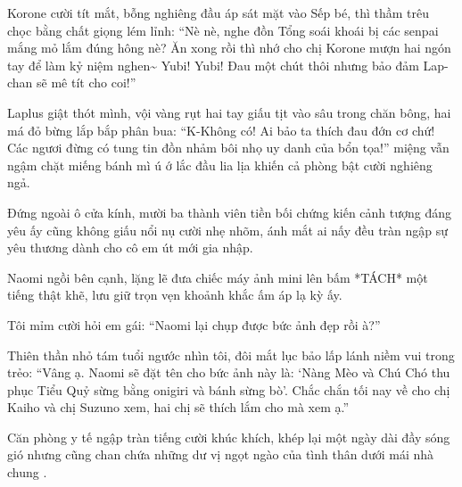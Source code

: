 \documentclass[../main.tex]{subfiles}
\begin{document}
Korone cười tít mắt, bỗng nghiêng đầu áp sát mặt vào Sếp bé, thì thầm trêu chọc bằng chất giọng lém lỉnh: ``Nè nè, nghe đồn Tổng soái khoái bị các senpai mắng mỏ lắm đúng hông nè? Ăn xong rồi thì nhớ cho chị Korone mượn hai ngón tay để làm kỷ niệm nghen\~{} Yubi! Yubi! Đau một chút thôi nhưng bảo đảm Lap-chan sẽ mê tít cho coi!''

Laplus giật thót mình, vội vàng rụt hai tay giấu tịt vào sâu trong chăn bông, hai má đỏ bừng lắp bắp phân bua: ``K-Không có! Ai bảo ta thích đau đớn cơ chứ! Các ngươi đừng có tung tin đồn nhảm bôi nhọ uy danh của bổn tọa!'' miệng vẫn ngậm chặt miếng bánh mì ú ớ lắc đầu lia lịa khiến cả phòng bật cười nghiêng ngả.

Đứng ngoài ô cửa kính, mười ba thành viên tiền bối chứng kiến cảnh tượng đáng yêu ấy cũng không giấu nổi nụ cười nhẹ nhõm, ánh mắt ai nấy đều tràn ngập sự yêu thương dành cho cô em út mới gia nhập.

Naomi ngồi bên cạnh, lặng lẽ đưa chiếc máy ảnh mini lên bấm *TÁCH* một tiếng thật khẽ, lưu giữ trọn vẹn khoảnh khắc ấm áp lạ kỳ ấy.

Tôi mỉm cười hỏi em gái: ``Naomi lại chụp được bức ảnh đẹp rồi à?''

Thiên thần nhỏ tám tuổi ngước nhìn tôi, đôi mắt lục bảo lấp lánh niềm vui trong trẻo: ``Vâng ạ. Naomi sẽ đặt tên cho bức ảnh này là: `Nàng Mèo và Chú Chó thu phục Tiểu Quỷ sừng bằng onigiri và bánh sừng bò'. Chắc chắn tối nay về cho chị Kaiho và chị Suzuno xem, hai chị sẽ thích lắm cho mà xem ạ.''

Căn phòng y tế ngập tràn tiếng cười khúc khích, khép lại một ngày dài đầy sóng gió nhưng cũng chan chứa những dư vị ngọt ngào của tình thân dưới mái nhà chung \hll.
\end{document}
